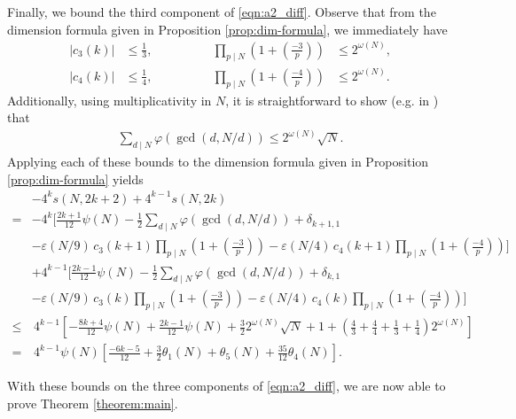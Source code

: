 \documentclass[11pt,letterpaper,reqno]{amsart}
\numberwithin{figure}{section}
\numberwithin{table}{section}
\theoremstyle{definition}
\theoremstyle{plain}
\newcommand{\lrabs}[1]{\left\lvert #1 \right\lvert}
\newcommand{\lrp}[1]{\left(#1\right)}
\newcommand{\lrb}[1]{\left[#1\right]}
\theoremstyle{definition}
\theoremstyle{definition}
\theoremstyle{remark}
\numberwithin{equation}{section}
\begin{document}
Finally, we bound the third component of \eqref{eqn:a2_diff}.
Observe that from the dimension formula given in Proposition \ref{prop:dim-formula}, we immediately have 
\begin{equation} \label{eqn:dim-formula-terms-bounds}
\begin{alignedat}{3}
    \lrabs{c_3(k)} &\leq \frac13,  \qquad\qquad &
    \prod_{p\mid N} \lrp{1 + \lrp{\frac{-3}{p}}} &\leq 2^{\omega(N)} ,  \\
    \lrabs{c_4(k)} &\leq \frac14, \qquad\qquad &
    \prod_{p\mid N} \lrp{1 + \lrp{\frac{-4}{p}}} &\leq 2^{\omega(N)}.
\end{alignedat}
\end{equation}
Additionally, using multiplicativity in $N$, it is straightforward to show (e.g. in 
\cite[Definition~12\textquotesingle(B),~Equation~(7)]{martin}) that 
\begin{align}
     \sum_{d\mid N} \varphi(\gcd(d,N/d)) \leq 2^{\omega(N)} \sqrt{N}.
\end{align}
Applying each of these bounds to the dimension formula given in Proposition \ref{prop:dim-formula} yields
\begin{align}
    &-4^{k}s(N, 2k+2) + 4^{k-1}s(N, 2k) \\
    =& -4^k \Bigg[ 
    \frac{2k+1}{12} \psi(N) - \frac12  \sum_{d\mid N} \varphi(\gcd(d,N/d)) + \delta_{k+1,1} \\
    & - \varepsilon(N/9)\, c_3(k+1) \prod_{p \mid N} \lrp{1 + \lrp{\frac{-3}{p}} } 
        - \varepsilon(N/4)\, c_4(k+1) \prod_{p \mid N} \lrp{1 + \lrp{\frac{-4}{p}} }
    \Bigg] \\
    & + 4^{k-1} \Bigg[ 
    \frac{2k-1}{12} \psi(N) - \frac12  \sum_{d\mid N} \varphi(\gcd(d,N/d)) + \delta_{k,1} \\
    & - \varepsilon(N/9)\, c_3(k) \prod_{p \mid N} \lrp{1 + \lrp{\frac{-3}{p}} } 
    - \varepsilon(N/4)\, c_4(k) \prod_{p \mid N} \lrp{1 + \lrp{\frac{-4}{p}} }
    \Bigg] \\
    \leq & \, 4^{k-1} \lrb{ -\frac{8k+4}{12} \psi(N)  + \frac{2k-1}{12} \psi(N) + \frac32  2^{\omega(N)} \sqrt{N} + 1 + \lrp{\frac43 + \frac44 + \frac13 + \frac14 } 2^{\omega(N)} } \\
    = & \, 4^{k-1} \psi(N) \lrb{ \frac{-6k-5}{12}  + \frac32 \theta_1(N) + \theta_5(N) + \frac{35}{12} \theta_4(N) }. \label{eqn:component3}
\end{align}




With these bounds on the three components of \eqref{eqn:a2_diff}, we are now able to prove Theorem \ref{theorem:main}.
\end{document}

